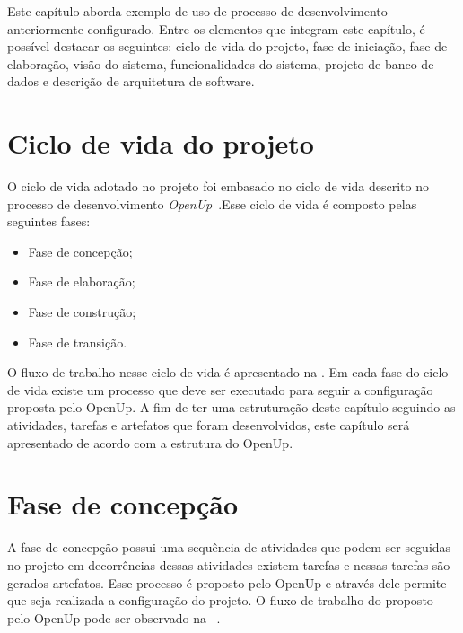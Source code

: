 Este capítulo aborda exemplo de uso de processo de desenvolvimento anteriormente configurado. Entre os elementos que integram este capítulo, é possível destacar os seguintes: ciclo de vida do projeto, fase de iniciação, fase de elaboração, visão do sistema, funcionalidades do sistema, projeto de banco de dados e descrição de arquitetura de software.

\section{Ciclo de vida do projeto}
O ciclo de vida adotado no projeto foi embasado no ciclo de vida descrito no processo de desenvolvimento  \emph{OpenUp}~\cite{openup}.Esse ciclo de vida é composto pelas seguintes fases:

\begin{itemize}
    \item Fase de concepção;
    \item Fase de elaboração;
    \item Fase de construção;
    \item Fase de transição.
\end{itemize}

%

O fluxo de trabalho nesse ciclo de vida é apresentado na . Em cada fase do ciclo de vida existe um processo que deve ser executado para seguir a configuração proposta pelo OpenUp. 
A fim de ter uma estruturação deste capítulo seguindo as atividades, tarefas e artefatos que foram desenvolvidos, este capítulo será apresentado de acordo com a estrutura do \acrfull{OpenUp}.

\section{Fase de concepção}

A fase de concepção possui uma sequência de atividades que podem ser seguidas no projeto em decorrências dessas atividades existem tarefas e nessas tarefas são gerados artefatos. Esse processo é proposto pelo \acrfull{OpenUp} e através dele permite que seja realizada a configuração do projeto. O fluxo de trabalho do proposto pelo \acrfull{OpenUp} pode ser observado na ~.

%

